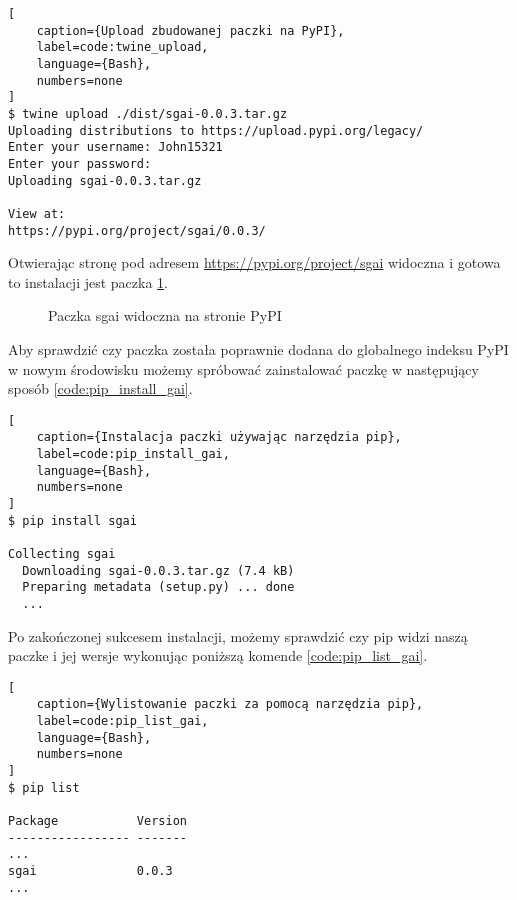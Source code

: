 \begin{onepage}
    \begin{lstlisting}[
    caption={Upload zbudowanej paczki na PyPI},
    label=code:twine_upload,
    language={Bash},
    numbers=none
]
$ twine upload ./dist/sgai-0.0.3.tar.gz
Uploading distributions to https://upload.pypi.org/legacy/
Enter your username: John15321
Enter your password:
Uploading sgai-0.0.3.tar.gz

View at:
https://pypi.org/project/sgai/0.0.3/
    \end{lstlisting}
\end{onepage}

\clearpage

Otwierając stronę pod adresem \url{https://pypi.org/project/sgai} widoczna i gotowa to instalacji jest paczka  \ref{img:sgai_on_pypi}.

\begin{figure}[h]
    \centering
    \caption{Paczka sgai widoczna na stronie PyPI}
    \label{img:sgai_on_pypi}
\end{figure}

Aby sprawdzić czy paczka została poprawnie dodana do globalnego indeksu PyPI w nowym środowisku możemy spróbować zainstalować paczkę  w następujący sposób \ref{code:pip_install_gai}.

\begin{onepage}
    \begin{lstlisting}[
    caption={Instalacja paczki używając narzędzia pip},
    label=code:pip_install_gai,
    language={Bash},
    numbers=none
]
$ pip install sgai

Collecting sgai
  Downloading sgai-0.0.3.tar.gz (7.4 kB)
  Preparing metadata (setup.py) ... done
  ...
\end{lstlisting}
\end{onepage}

Po zakończonej sukcesem instalacji, możemy sprawdzić czy pip widzi naszą paczke i jej wersje wykonując poniższą komende \ref{code:pip_list_gai}.

\begin{onepage}
    \begin{lstlisting}[
    caption={Wylistowanie paczki za pomocą narzędzia pip},
    label=code:pip_list_gai,
    language={Bash},
    numbers=none
]
$ pip list

Package           Version
----------------- -------
...
sgai              0.0.3
...
\end{lstlisting}
\end{onepage}



